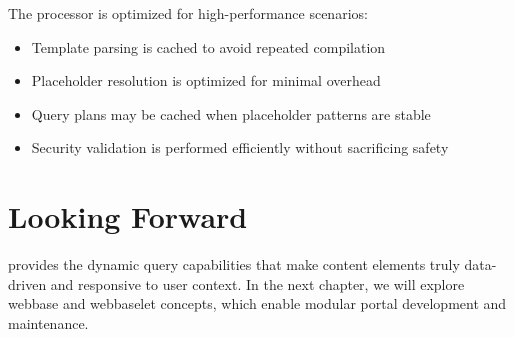 The \wbpl{} processor is optimized for high-performance scenarios:

\begin{itemize}
\item Template parsing is cached to avoid repeated compilation
\item Placeholder resolution is optimized for minimal overhead
\item Query plans may be cached when placeholder patterns are stable
\item Security validation is performed efficiently without sacrificing safety
\end{itemize}

\section{Looking Forward}
\label{sec:wbpl-forward}

\wbpl{} provides the dynamic query capabilities that make \wbdl{} content elements truly data-driven and responsive to user context. In the next chapter, we will explore webbase and webbaselet concepts, which enable modular portal development and maintenance.
